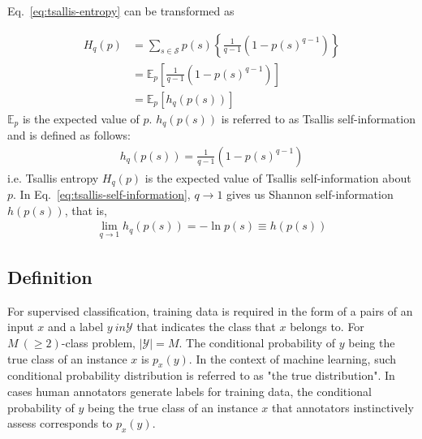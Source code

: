 \documentclass[a4paper,conference]{IEEEtran}
\begin{document}
Eq.~\eqref{eq:tsallis-entropy} can be transformed as

\begin{align}
    H_{q}(p)
    &= \sum_{s \in \mathcal{S}}p(s)\left\{\frac{1}{q-1}(1-p(s)^{q-1})\right\}\nonumber\\
    &=\mathbb{E}_{p}\left[\frac{1}{q-1}\left(1 - p(s)^{q-1}\right)\right]\nonumber\\
    &= \mathbb{E}_{p}[h_{q}(p(s))]
\end{align}
$\mathbb{E}_{p}$ is the expected value of $p$.
$h_{q}(p(s))$ is referred to as Tsallis self-information and is defined as follows:
\begin{align}
    h_{q}(p(s)) = \frac{1}{q-1}\left(1 - p(s)^{q-1}\right)\label{eq:tsallis-self-information}
\end{align}
i.e. Tsallis entropy $H_{q}(p)$ is the expected value of Tsallis self-information about $p$.
In Eq.~\eqref{eq:tsallis-self-information}, $q \rightarrow 1$ gives us Shannon self-information $h(p(s))$, that is, 
\begin{align}
    \lim_{q \rightarrow 1}h_{q}(p(s)) = - \ln p(s) \equiv h(p(s))\label{eq:shannon-self-information}
\end{align}

\subsection{Definition}
For supervised classification, training data is required in the form of a pairs of an input $x$ and a label $y \ in \mathcal{Y}$ that indicates the class that $x$ belongs to.
For $M~(\geq2)$-class problem, $|\mathcal{Y}| = M$.
The conditional probability of $y$ being the true class of an instance $x$ is $p_{x}(y)$.
In the context of machine learning, such conditional probability distribution is referred to as "the true distribution".
In cases human annotators generate labels for training data, the conditional probability of $y$ being the true class of an instance $x$ that annotators instinctively assess corresponds to $p_{x}(y)$.
\end{document}
